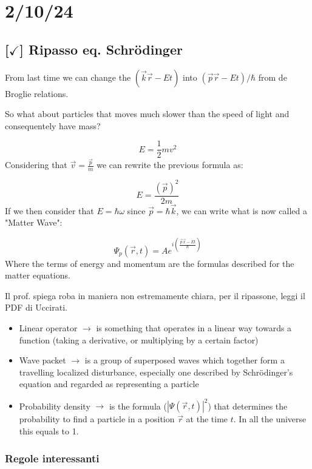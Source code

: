 \section{2/10/24}

\subsection{[$\checkmark$] Ripasso eq. Schr\"{o}dinger}

From last time we can change the $(\vec{k}\vec{r} - Et)$ into $(\vec{p}\vec{r} - Et) / \hbar$ from de Broglie relations.

So what about particles that moves much slower than the speed of light and consequentely have mass?

$$ E = \frac{1}{2} mv^2$$
%
Considering that $\vec{v} = \frac{\vec{p}}{m}$ we can rewrite the previous formula as:

$$ E = \frac{(\vec{p})^2}{2m} $$
%
If we then consider that $E = \hbar \omega$ since $\vec{p} = \hbar \vec{k}$, we can write what is now called a "Matter Wave":

$$ \Psi_{p} (\vec{r}, t) = Ae^{i \left( \frac{\vec{p}\vec{x} - Et}{\hbar} \right)} $$
%
Where the terms of energy and momentum are the formulas described for the matter equations.

Il prof. spiega roba in maniera non estremamente chiara, per il ripassone, leggi il PDF di Uccirati.

\hrulefill
\begin{itemize}

    \item Linear operator $\longrightarrow$ is something that operates in a linear way towards a function (taking a derivative, or multiplying by a certain factor)
    \item Wave packet $\longrightarrow$ is a group of superposed waves which together form a travelling localized disturbance, especially one described by Schr\"{o}dinger's equation and regarded as representing a particle
    \item Probability density $\longrightarrow$ is the formula ($|\Psi(\vec{r},t)|^2$) that determines the probability to find a particle in a position $\vec{r}$ at the time $t$. In all the universe this equals to 1.
\end{itemize}

\subsubsection{Regole interessanti}

